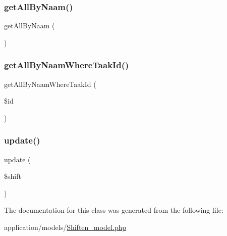 \mbox{\label{class_shiften___model_a2b035b1ffd1cbe651b35bb3e53d72c09}} 
\subsubsection{\texorpdfstring{get\+All\+By\+Naam()}{getAllByNaam()}}
{\footnotesize\ttfamily get\+All\+By\+Naam (\begin{DoxyParamCaption}{ }\end{DoxyParamCaption})}

\mbox{\label{class_shiften___model_a537c83774b71a66979239cdffbb584d4}} 
\subsubsection{\texorpdfstring{get\+All\+By\+Naam\+Where\+Taak\+Id()}{getAllByNaamWhereTaakId()}}
{\footnotesize\ttfamily get\+All\+By\+Naam\+Where\+Taak\+Id (\begin{DoxyParamCaption}\item[{}]{\$id }\end{DoxyParamCaption})}

\mbox{\label{class_shiften___model_a0275d30c0139203609e59da92dc43790}} 
\subsubsection{\texorpdfstring{update()}{update()}}
{\footnotesize\ttfamily update (\begin{DoxyParamCaption}\item[{}]{\$shift }\end{DoxyParamCaption})}



The documentation for this class was generated from the following file\+:\begin{DoxyCompactItemize}
\item 
application/models/\mbox{\hyperlink{_shiften__model_8php}{Shiften\+\_\+model.\+php}}\end{DoxyCompactItemize}
